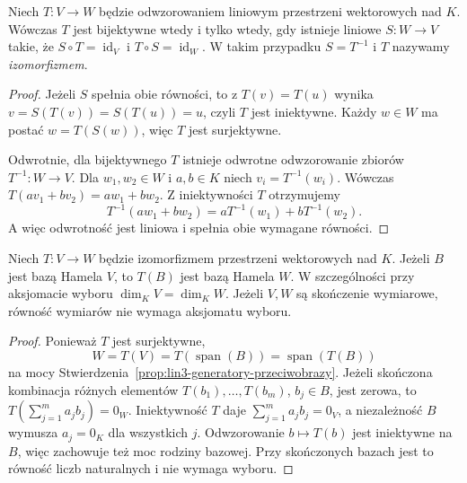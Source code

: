 \begin{twierdzenie}
\label{thm:lin3-odwrotnosc}
Niech \(T\colon V\to W\) będzie odwzorowaniem
liniowym przestrzeni wektorowych nad \(K\).
Wówczas \(T\) jest bijektywne wtedy i tylko wtedy,
gdy istnieje liniowe \(S\colon W\to V\)
takie, że \(S\circ T=\operatorname{id}_V\)
i \(T\circ S=\operatorname{id}_W\).
W takim przypadku \(S=T^{-1}\) i \(T\)
nazywamy \emph{izomorfizmem}.
\end{twierdzenie}
\begin{proof}
Jeżeli \(S\) spełnia obie równości,
to z \(T(v)=T(u)\) wynika
\(v=S(T(v))=S(T(u))=u\), czyli \(T\)
jest iniektywne. Każdy \(w\in W\)
ma postać \(w=T(S(w))\), więc \(T\) jest surjektywne.

Odwrotnie, dla bijektywnego \(T\)
istnieje odwrotne odwzorowanie zbiorów
\(T^{-1}\colon W\to V\).
Dla \(w_1,w_2\in W\) i \(a,b\in K\)
niech \(v_i=T^{-1}(w_i)\).
Wówczas
\(T(av_1+bv_2)=aw_1+bw_2\).
Z iniektywności \(T\) otrzymujemy
\[
 T^{-1}(aw_1+bw_2)
 =aT^{-1}(w_1)+bT^{-1}(w_2).
\]
A więc odwrotność jest liniowa
i spełnia obie wymagane równości.
\end{proof}

\begin{stwierdzenie}
\label{prop:lin3-izomorfizm-baza}
Niech \(T\colon V\to W\) będzie izomorfizmem
przestrzeni wektorowych nad \(K\).
Jeżeli \(B\) jest bazą Hamela \(V\),
to \(T(B)\) jest bazą Hamela \(W\).
W szczególności przy aksjomacie wyboru
\(\dim_KV=\dim_KW\).
Jeżeli \(V,W\) są skończenie wymiarowe,
równość wymiarów nie wymaga aksjomatu wyboru.
\end{stwierdzenie}
\begin{proof}
Ponieważ \(T\) jest surjektywne,
\[
 W=T(V)=T(\operatorname{span}(B))
   =\operatorname{span}(T(B))
\]
na mocy Stwierdzenia~\ref{prop:lin3-generatory-przeciwobrazy}.
Jeżeli skończona kombinacja różnych elementów
\(T(b_1),\ldots,T(b_m)\), \(b_j\in B\),
jest zerowa, to
\(T(\sum_{j=1}^{m}a_jb_j)=0_W\).
Iniektywność \(T\) daje
\(\sum_{j=1}^{m}a_jb_j=0_V\),
a niezależność \(B\) wymusza \(a_j=0_K\)
dla wszystkich \(j\).
Odwzorowanie \(b\mapsto T(b)\) jest iniektywne
na \(B\), więc zachowuje też moc rodziny bazowej.
Przy skończonych bazach jest to równość liczb
naturalnych i nie wymaga wyboru.
\end{proof}

